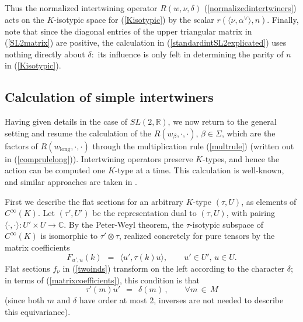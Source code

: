 \documentclass[12pt]{article}
\numberwithin{equation}{section}
\renewcommand\a{\alpha}
\newcommand{\R}{{\mathbb{R}}}
\newcommand{\C}{{\mathbb{C}}}
\renewcommand\({\left(}
\renewcommand\){\right)}
\begin{document}
Thus the normalized intertwining operator $R(w,\nu,\delta)$ (\ref{normalizedintertwiners}) acts on the $K$-isotypic space for (\ref{Kisotypic}) by the scalar $r(\langle \nu,\a^\vee\rangle,n)$.
Finally, note that since the diagonal entries of the upper triangular matrix in (\ref{SL2matrix}) are positive, the calculation in (\ref{standardintSL2explicated}) uses nothing directly about $\delta$:~its influence is only felt in determining the parity of $n$ in (\ref{Kisotypic}).



\subsection{Calculation of simple intertwiners}\label{sec:sub:calculation}


Having given details in the case of $SL(2,\R)$, we now return to the general setting  and
resume the calculation of the $R(w_{\beta},\cdot,\cdot)$, $\beta\in\Sigma$, which are the factors of $R(w_{\text{long}},\cdot,\cdot)$ through the multiplication rule (\ref{multrule}) (written out in  (\ref{comprulelong})).  Intertwining operators preserve $K$-types, and hence the action can be computed  one $K$-type at a time.  This calculation is well-known, and similar approaches are taken in \cite{Vogan,Zhang}.

First we describe the flat sections for an arbitrary $K$-type $(\tau,U)$, as elements of $C^\infty(K)$.  Let $(\tau',U')$ be the  representation dual to $(\tau,U)$, with pairing $\langle \cdot,\cdot\rangle:U'\times U\rightarrow \C$.  By the Peter-Weyl theorem, the $\tau$-isotypic subspace of $C^\infty(K)$ is isomorphic to $\tau'\otimes \tau$, realized concretely for pure tensors by the matrix coefficients
\begin{equation}\label{matrixcoefficients}
  F_{u',u}(k) \ \ = \ \ \langle u',\tau(k)u\rangle, \qquad u'\in U', \,u\in U.
\end{equation}
 Flat sections $f_\nu$ in (\ref{twoinds})  transform on the left according to the character $\delta$; in terms of (\ref{matrixcoefficients}), this condition is that
\begin{equation}\label{taum}
\tau'(m) u' \ \ = \ \ \delta(m)\,,\qquad \forall m\,\in\,M
\end{equation}
(since both $m$ and $\delta$ have order at most 2,  inverses are not needed to describe this equivariance).
\end{document}
